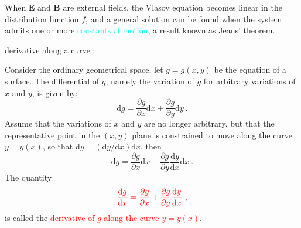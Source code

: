 \documentclass[12pt,a4paper]{article}
\renewcommand{\vec}[1]{\boldsymbol{#1}}
\newcommand{\dif}{\mathrm{d}}
\newcounter{theo}[section]\setcounter{theo}{0}
\begin{document}
When $\vec{E}$ and $\vec{B}$ are external fields, the Vlasov equation becomes linear in the distribution function $f$, and a general solution can be found when the system admits one or more \textcolor{cyan}{constants of motion}, a result known as Jeans' theorem.

derivative along a curve : 

Consider the ordinary geometrical space, let $g = g(x, y)$ be the equation of a surface. The differential of $g$, namely the variation of $g$ for arbitrary variations of $x$ and $y$, is given by:
\begin{equation*}
\dif g = \frac{\partial g}{\partial x} \dif x + \frac{\partial g}{\partial y} \dif y ~.
\end{equation*}
Assume that the variations of $x$ and $y$ are no longer arbitrary, but that the representative point in the $(x, y)$ plane is constrained to move along the curve $y = y(x)$, so that $\dif y = (\dif y/\dif x) \dif x$, then
\begin{equation*}
\dif g = \frac{\partial g}{\partial x} \dif x + \frac{\partial g}{\partial y} \frac{\dif y}{\dif x} \dif x ~.
\end{equation*}
The quantity
\begin{equation}
\color{red} \frac{\dif g}{\dif x}  = \frac{\partial g}{\partial x} + \frac{\partial g}{\partial y} \frac{\dif y}{\dif x} ~,
\end{equation}
is called the \textcolor{red}{derivative of $g$ along the curve $y = y(x)$}.
\end{document}
